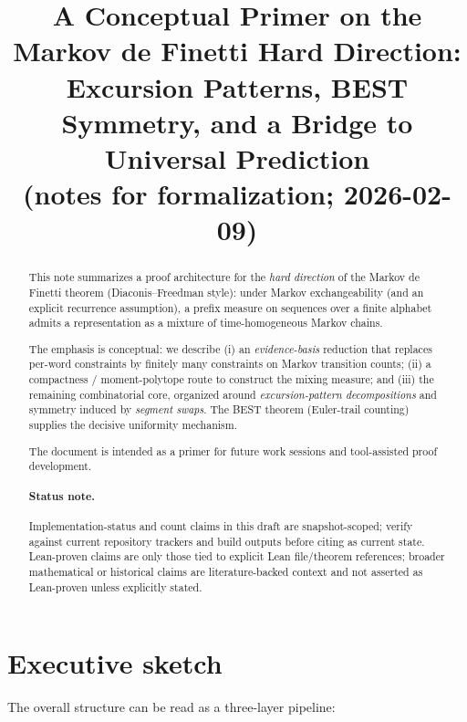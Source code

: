 \documentclass[11pt]{article}
\title{A Conceptual Primer on the Markov de Finetti Hard Direction:\\
Excursion Patterns, BEST Symmetry, and a Bridge to Universal Prediction\\
{\large (notes for formalization; 2026-02-09)}}
\author{}
\date{}
\begin{document}
\maketitle

\begin{abstract}
This note summarizes a proof architecture for the \emph{hard direction} of the Markov de Finetti
theorem (Diaconis--Freedman style): under Markov exchangeability (and an explicit recurrence
assumption), a prefix measure on sequences over a finite alphabet admits a representation as a
mixture of time-homogeneous Markov chains.

The emphasis is conceptual: we describe (i) an \emph{evidence-basis} reduction that replaces
per-word constraints by finitely many constraints on Markov transition counts; (ii) a compactness /
moment-polytope route to construct the mixing measure; and (iii) the remaining combinatorial core,
organized around \emph{excursion-pattern decompositions} and symmetry induced by \emph{segment swaps}.
The BEST theorem (Euler-trail counting) supplies the decisive uniformity mechanism.

The document is intended as a primer for future work sessions and tool-assisted proof development.
\paragraph{Status note.} Implementation-status and count claims in this draft are snapshot-scoped; verify against current repository trackers and build outputs before citing as current state. Lean-proven claims are only those tied to explicit Lean file/theorem references; broader mathematical or historical claims are literature-backed context and not asserted as Lean-proven unless explicitly stated.
\end{abstract}

\section{Executive sketch}

The overall structure can be read as a three-layer pipeline:
\end{document}
